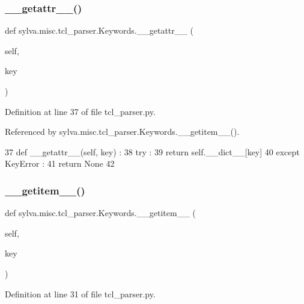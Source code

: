 \subsubsection{\texorpdfstring{\+\_\+\+\_\+getattr\+\_\+\+\_\+()}{\_\_getattr\_\_()}}
{\footnotesize\ttfamily def sylva.\+misc.\+tcl\+\_\+parser.\+Keywords.\+\_\+\+\_\+getattr\+\_\+\+\_\+ (\begin{DoxyParamCaption}\item[{}]{self,  }\item[{}]{key }\end{DoxyParamCaption})}



Definition at line 37 of file tcl\+\_\+parser.\+py.



Referenced by sylva.\+misc.\+tcl\+\_\+parser.\+Keywords.\+\_\+\+\_\+getitem\+\_\+\+\_\+().


\begin{DoxyCode}
37     \textcolor{keyword}{def }\_\_getattr\_\_(self, key) :
38       \textcolor{keywordflow}{try} :
39         \textcolor{keywordflow}{return} self.\_\_dict\_\_[key]
40       \textcolor{keywordflow}{except} KeyError :
41         \textcolor{keywordflow}{return} \textcolor{keywordtype}{None}
42 
\end{DoxyCode}
\mbox{\label{classsylva_1_1misc_1_1tcl__parser_1_1_keywords_ae638df94fbcd53ba58d430f33daef296}} 
\subsubsection{\texorpdfstring{\+\_\+\+\_\+getitem\+\_\+\+\_\+()}{\_\_getitem\_\_()}}
{\footnotesize\ttfamily def sylva.\+misc.\+tcl\+\_\+parser.\+Keywords.\+\_\+\+\_\+getitem\+\_\+\+\_\+ (\begin{DoxyParamCaption}\item[{}]{self,  }\item[{}]{key }\end{DoxyParamCaption})}



Definition at line 31 of file tcl\+\_\+parser.\+py.



